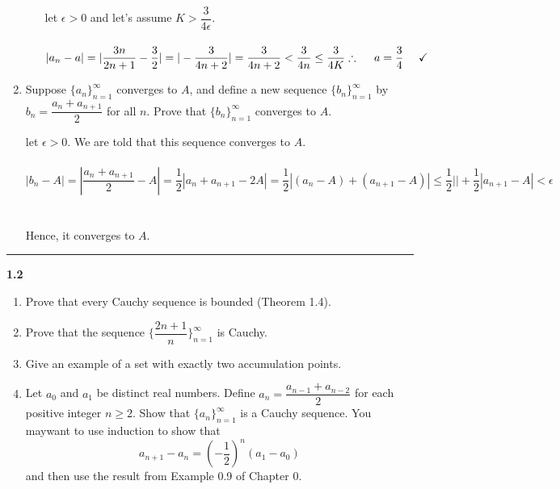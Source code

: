 \documentclass[fleqn]{article}
\begin{document}
\begin{enumerate}
\begin{enumerate}
        \textcolor{hwColor}{
          let $\epsilon > 0$ and let's assume $K>\dfrac{3}{4 \epsilon}$.
          \\
          \\
          $
            |a_n-a|=|\dfrac{3n}{2n+1}-\dfrac{3}{2}|=|-\dfrac{3}{4n+2}|=\dfrac{3}{4n+2}<\dfrac{3}{4n}\leq \dfrac{3}{4K}
            \\
            \\
            \\
            \therefore ~~~~ a=\dfrac{3}{4} ~~~~ \checkmark
          $
        }

    \end{enumerate}

    \item Suppose $\{a_n\}_{n=1}^{\infty}$ converges to $A$, and define a new sequence $\{b_n\}_{n=1}^{\infty}$ by
    $b_n=\dfrac{a_n+a_{n+1}}{2}$ for all $n$. Prove that $\{b_n\}_{n=1}^{\infty}$ converges to $A$.

    \textcolor{hwColor}{
      let $\epsilon > 0$. We are told that this sequence converges to $A$.
      \\
      \\
      $
        |b_n-A|=|\dfrac{a_n+a_{n+1}}{2}-A|=\dfrac{1}{2}|a_n+a_{n+1}-2A|=\dfrac{1}{2}|(a_n-A)+(a_{n+1}-A)|\leq \dfrac{1}{2} ||+\dfrac{1}{2} |a_{n+1}-A| < \epsilon
      $
      \\
      \\
      \\
      Hence, it converges to $A$. 
    }

  \end{enumerate}

  \rule{15cm}{2pt}

  \textbf{1.2}
  \begin{enumerate}
    \item Prove that every Cauchy sequence is bounded (Theorem 1.4).

    \item Prove that the sequence $\{\dfrac{2n+1}{n}\}_{n=1}^{\infty}$ is Cauchy.

    \item Give an example of a set with exactly two accumulation points.

    \item Let $a_0$ and $a_1$ be distinct real numbers. Define $a_n=\dfrac{a_{n-1}+a_{n-2}}{2}$ for each positive integer
    $n \geqslant 2$. Show that $\{a_n\}_{n=1}^{\infty}$ is a Cauchy sequence. You maywant to use induction to show that
    $$
      a_{n+1}-a_n=\left(-\dfrac{1}{2}\right)^n \left(a_1-a_0\right)
    $$
    and then use the result from Example 0.9 of Chapter 0.
  \end{enumerate}
\end{document}
